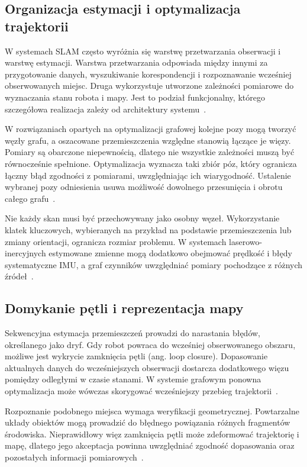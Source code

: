 \documentclass[a4paper,twoside,12pt]{book}
\begin{document}
\subsection{Organizacja estymacji i optymalizacja trajektorii}

W systemach SLAM często wyróżnia się warstwę przetwarzania obserwacji i warstwę estymacji. Warstwa przetwarzania odpowiada między innymi za przygotowanie danych, wyszukiwanie korespondencji i rozpoznawanie wcześniej obserwowanych miejsc. Druga wykorzystuje utworzone zależności pomiarowe do wyznaczania stanu robota i mapy. Jest to podział funkcjonalny, którego szczegółowa realizacja zależy od architektury systemu~\cite{rb34_cadena2016}.

W rozwiązaniach opartych na optymalizacji grafowej kolejne pozy mogą tworzyć węzły grafu, a oszacowane przemieszczenia względne stanowią łączące je więzy. Pomiary są obarczone niepewnością, dlatego nie wszystkie zależności muszą być równocześnie spełnione. Optymalizacja wyznacza taki zbiór póz, który ogranicza łączny błąd zgodności z pomiarami, uwzględniając ich wiarygodność. Ustalenie wybranej pozy odniesienia usuwa możliwość dowolnego przesunięcia i obrotu całego grafu~\cite{rb3_barfoot2017}.

Nie każdy skan musi być przechowywany jako osobny węzeł. Wykorzystanie klatek kluczowych, wybieranych na przykład na podstawie przemieszczenia lub zmiany orientacji, ogranicza rozmiar problemu. W systemach laserowo-inercyjnych estymowane zmienne mogą dodatkowo obejmować prędkość i błędy systematyczne IMU, a graf czynników uwzględniać pomiary pochodzące z różnych źródeł~\cite{9341176}.

\subsection{Domykanie pętli i reprezentacja mapy}

Sekwencyjna estymacja przemieszczeń prowadzi do narastania błędów, określanego jako dryf. Gdy robot powraca do wcześniej obserwowanego obszaru, możliwe jest wykrycie zamknięcia pętli (ang. loop closure). Dopasowanie aktualnych danych do wcześniejszych obserwacji dostarcza dodatkowego więzu pomiędzy odległymi w czasie stanami. W systemie grafowym ponowna optymalizacja może wówczas skorygować wcześniejszy przebieg trajektorii~\cite{rb3_barfoot2017}.

Rozpoznanie podobnego miejsca wymaga weryfikacji geometrycznej. Powtarzalne układy obiektów mogą prowadzić do błędnego powiązania różnych fragmentów środowiska. Nieprawidłowy więz zamknięcia pętli może zdeformować trajektorię i mapę, dlatego jego akceptacja powinna uwzględniać zgodność dopasowania oraz pozostałych informacji pomiarowych~\cite{rb34_cadena2016}.
\end{document}
